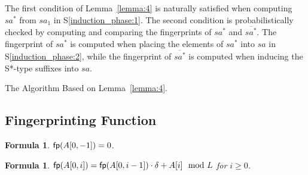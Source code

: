 \documentclass[10pt,journal,compsoc]{IEEEtran}
\newtheorem{formula}[theorem]{Formula}
\begin{document}
The first condition of Lemma~\ref{lemma:4} is naturally satisfied when computing $sa^*$ from $sa_1$ in S\ref{induction_phase:1}. The second condition is probabilistically checked by computing and comparing the fingerprints of $sa^*$ and $\overline{sa^*}$. The fingerprint of $sa^*$ is computed when placing the elements of $sa^*$ into $sa$ in S\ref{induction_phase:2}, while the fingerprint of $\overline{sa^*}$ is computed when inducing the S*-type suffixes into $sa$.


\begin{algorithm*}

	\caption{The Algorithm Based on Lemma~\ref{lemma:4}.}
	
	\label{alg:3}
	
\end{algorithm*}


\subsection{Fingerprinting Function}

\begin{formula} \label{formula:1}${\sf fp}(A[0, -1]) = 0$.
\end{formula}

\begin{formula} \label{formula:2}${\sf fp}(A[0, i]) = {\sf fp}(A[0, i - 1]) \cdot {\delta} + A[i]\mod L$ for $i \ge 0$.
\end{formula}
\end{document}
